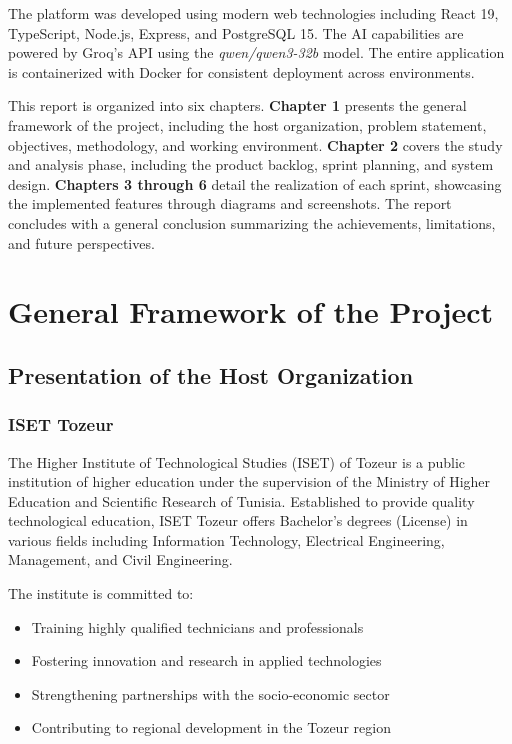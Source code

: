 \documentclass[12pt,a4paper]{report}
\begin{document}
The platform was developed using modern web technologies including React 19, TypeScript, Node.js, Express, and PostgreSQL 15. The AI capabilities are powered by Groq's API using the \textit{qwen/qwen3-32b} model. The entire application is containerized with Docker for consistent deployment across environments.

This report is organized into six chapters. \textbf{Chapter 1} presents the general framework of the project, including the host organization, problem statement, objectives, methodology, and working environment. \textbf{Chapter 2} covers the study and analysis phase, including the product backlog, sprint planning, and system design. \textbf{Chapters 3 through 6} detail the realization of each sprint, showcasing the implemented features through diagrams and screenshots. The report concludes with a general conclusion summarizing the achievements, limitations, and future perspectives.

\chapter{General Framework of the Project}

\section{Presentation of the Host Organization}

\subsection{ISET Tozeur}

The Higher Institute of Technological Studies (ISET) of Tozeur is a public institution of higher education under the supervision of the Ministry of Higher Education and Scientific Research of Tunisia. Established to provide quality technological education, ISET Tozeur offers Bachelor's degrees (License) in various fields including Information Technology, Electrical Engineering, Management, and Civil Engineering.

The institute is committed to:
\begin{itemize}
    \item Training highly qualified technicians and professionals
    \item Fostering innovation and research in applied technologies
    \item Strengthening partnerships with the socio-economic sector
    \item Contributing to regional development in the Tozeur region
\end{itemize}
\end{document}
